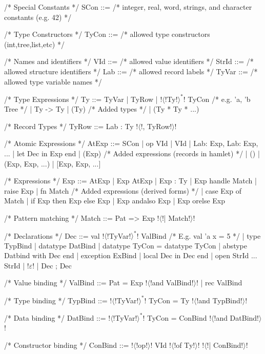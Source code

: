 \documentclass[a4paper,11pt]{article}
\begin{document}
\begin{grm}
/* Special Constants */
SCon ::= /* integer, real, word, strings, 
            and character constants (e.g. 42) */

/* Type Constructors */
TyCon ::= /* allowed type constructors (int,tree,list,etc) */

/* Names and identifiers */
VId   ::= /* allowed value identifiers */
StrId ::= /* allowed structure identifiers */
Lab   ::= /* allowed record labels */
TyVar ::= /* allowed type variable names */

/* Type Expressions */
Ty ::= TyVar
     | { TyRow }
     | !$\langle$!Ty!$\rangle^*$! TyCon /* e.g. 'a, 'b Tree */
     | Ty -> Ty
     | (Ty)
     /* Added types */
     | (Ty * Ty * ...)

/* Record Types */
TyRow ::= Lab : Ty !$\langle$!, TyRow!$\rangle$!

/* Atomic Expressions */
AtExp ::= SCon 
        | op VId 
        | VId 
        | {Lab: Exp, Lab: Exp, ...} 
        | let Dec in Exp end 
        | (Exp) 
        /* Added expressions (records in hamlet) */
        | () 
        | (Exp, Exp, ...) 
        | [Exp, Exp, ...]

/* Expressions */
Exp ::= AtExp 
      | Exp AtExp 
      | Exp : Ty 
      | Exp handle Match
      | raise Exp 
      | fn Match
      /* Added expressions (derived forms) */
      | case Exp of Match 
      | if Exp then Exp else Exp
      | Exp andalso Exp 
      | Exp orelse Exp

/* Pattern matching */
Match ::= Pat => Exp !$\langle$!| Match!$\rangle$!

/* Declarations */
Dec ::= val !$\langle$!TyVar!$\rangle^*$! ValBind /* E.g. val 'a x = 5 */
      | type TypBind
      | datatype DatBind
      | datatype TyCon = datatype TyCon
      | abstype Datbind with Dec end
      | exception ExBind
      | local Dec in Dec end
      | open StrId ... StrId
      | !$\varepsilon$!
      | Dec ; Dec
      
/* Value binding */
ValBind ::= Pat = Exp !$\langle$!and ValBind!$\rangle$!
          | rec ValBind

/* Type binding */
TypBind ::= !$\langle$!TyVar!$\rangle^*$!  TyCon = Ty !$\langle$!and TypBind!$\rangle$!

/* Data binding */
DatBind ::= !$\langle$!TyVar!$\rangle^*$!  TyCon = ConBind !$\langle$!and DatBind!$\rangle$!

/* Constructor binding */
ConBind ::= !$\langle$!op!$\rangle$! VId !$\langle$!of Ty!$\rangle$! !$\langle$!| ConBind!$\rangle$!


\end{grm}
\end{document}
